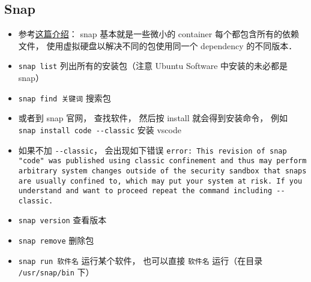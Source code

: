 \subsection{Snap}
\begin{itemize}
\item 参考\href{https://www.howtogeek.com/660193/how-to-work-with-snap-packages-on-linux/}{这篇介绍}： snap 基本就是一些微小的 container 每个都包含所有的依赖文件， 使用虚拟硬盘以解决不同的包使用同一个 dependency 的不同版本．
\item \verb|snap list| 列出所有的安装包（注意 Ubuntu Software 中安装的未必都是 snap）
\item \verb|snap find 关键词| 搜索包
\item 或者到 snap 官网， 查找软件， 然后按 install 就会得到安装命令， 例如 \verb|snap install code --classic| 安装 vscode
\item 如果不加 \verb|--classic|， 会出现如下错误 \verb|error: This revision of snap "code" was published using classic confinement and thus may perform arbitrary system changes outside of the security sandbox that snaps are usually confined to, which may put your system at risk. If you understand and want to proceed repeat the command including --classic.|
\item \verb|snap version| 查看版本
\item \verb|snap remove| 删除包
\item \verb|snap run 软件名| 运行某个软件， 也可以直接 \verb|软件名| 运行（在目录 \verb|/usr/snap/bin| 下）
\end{itemize}
